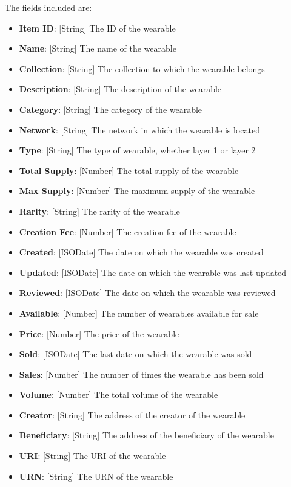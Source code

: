 \documentclass[MSE,Master,english]{twbook}%
\begin{document}
The fields included are:
\begin{itemize}
  \item \textbf{Item ID}: [String] The ID of the wearable
  \item \textbf{Name}: [String] The name of the wearable
  \item \textbf{Collection}: [String] The collection to which the wearable belongs
  \item \textbf{Description}: [String] The description of the wearable
  \item \textbf{Category}: [String] The category of the wearable
  \item \textbf{Network}: [String] The network in which the wearable is located
  \item \textbf{Type}: [String] The type of wearable, whether layer 1 or layer 2
  \item \textbf{Total Supply}: [Number] The total supply of the wearable
  \item \textbf{Max Supply}: [Number] The maximum supply of the wearable
  \item \textbf{Rarity}: [String] The rarity of the wearable
  \item \textbf{Creation Fee}: [Number] The creation fee of the wearable
  \item \textbf{Created}: [ISODate] The date on which the wearable was created
  \item \textbf{Updated}: [ISODate] The date on which the wearable was last updated
  \item \textbf{Reviewed}: [ISODate] The date on which the wearable was reviewed
  \item \textbf{Available}: [Number] The number of wearables available for sale
  \item \textbf{Price}: [Number] The price of the wearable
  \item \textbf{Sold}: [ISODate] The last date on which the wearable was sold
  \item \textbf{Sales}: [Number] The number of times the wearable has been sold
  \item \textbf{Volume}: [Number] The total volume of the wearable
  \item \textbf{Creator}: [String] The address of the creator of the wearable
  \item \textbf{Beneficiary}: [String] The address of the beneficiary of the wearable
  \item \textbf{URI}: [String] The URI of the wearable
  \item \textbf{URN}: [String] The URN of the wearable
\end{itemize}
\end{document}
